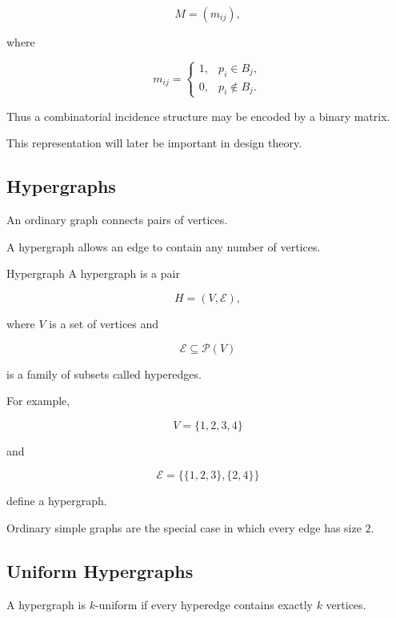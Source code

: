 \[
M=(m_{ij}),
\]

where

\[
\boxed{
m_{ij}
=
\begin{cases}
1,&p_i\in B_j,\\
0,&p_i\notin B_j.
\end{cases}
}
\]

Thus a combinatorial incidence structure may be encoded by a binary
matrix.

This representation will later be important in design theory.

\subsection{Hypergraphs}
\label{subsec:hypergraphs-discrete}

An ordinary graph connects pairs of vertices.

A hypergraph allows an edge to contain any number of vertices.

\begin{definitionbox}{Hypergraph}
A hypergraph is a pair

\[
\boxed{
H=(V,\mathcal{E}),
}
\]

where \(V\) is a set of vertices and

\[
\mathcal{E}\subseteq\mathcal{P}(V)
\]

is a family of subsets called hyperedges.
\end{definitionbox}

For example,

\[
V=\{1,2,3,4\}
\]

and

\[
\mathcal{E}
=
\{
\{1,2,3\},
\{2,4\}
\}
\]

define a hypergraph.

Ordinary simple graphs are the special case in which every edge has
size \(2\).

\subsection{Uniform Hypergraphs}
\label{subsec:uniform-hypergraphs}

A hypergraph is \(k\)-uniform if every hyperedge contains exactly \(k\)
vertices.

